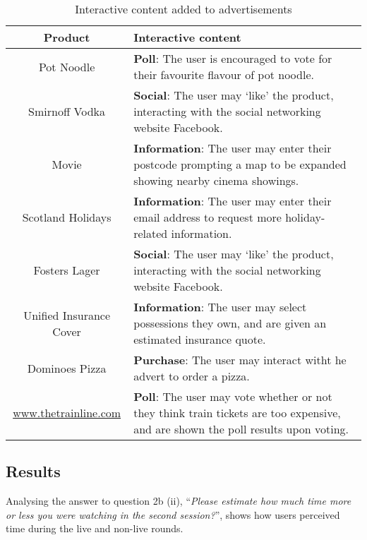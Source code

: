 	\begin{table}[hb]
		\centering
		\begin{tabularx}{\linewidth}{ c X }
			\toprule
			\bf Product & \bf Interactive content \\
			\midrule
			Pot Noodle & \textbf{Poll}: The user is encouraged to vote for their favourite flavour of pot noodle. \\
			Smirnoff Vodka & \textbf{Social}: The user may `like' the product, interacting with the social networking website Facebook. \\ %
			Movie & \textbf{Information}: The user may enter their postcode prompting a map to be expanded showing nearby cinema showings. \\
			Scotland Holidays & \textbf{Information}: The user may enter their email address to request more holiday-related information. \\
			Fosters Lager & \textbf{Social}: The user may `like' the product, interacting with the social networking website Facebook. \\
			Unified Insurance Cover & \textbf{Information}: The user may select possessions they own, and are given an estimated insurance quote. \\
			Dominoes Pizza & \textbf{Purchase}: The user may interact witht he advert to order a pizza. \\
			\url{www.thetrainline.com} & \textbf{Poll}: The user may vote whether or not they think train tickets are too expensive, and are shown the poll results upon voting. \\
			\bottomrule
		\end{tabularx}
		\caption{Interactive content added to advertisements}
		\label{tab:interactive_content}
	\end{table}

	\subsection{Results}

	Analysing the answer to question 2b (ii), ``\textit{Please estimate how much time more or less you were watching in the second session?}'', shows how users perceived time during the live and non-live rounds. 


